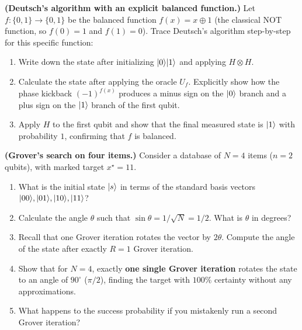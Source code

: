 \begin{exercise}\label{ch42:ex-deutsch-trace}
\textbf{(Deutsch's algorithm with an explicit balanced function.)}
Let $f: \{0, 1\} \to \{0, 1\}$ be the balanced function $f(x) = x \oplus 1$ (the classical NOT function, so $f(0) = 1$ and $f(1) = 0$).
Trace Deutsch's algorithm step-by-step for this specific function:
\begin{enumerate}
  \item Write down the state after initializing $\lvert 0 \rangle\lvert 1 \rangle$ and applying $H \otimes H$.
  \item Calculate the state after applying the oracle $U_f$. Explicitly show how the phase kickback $(-1)^{f(x)}$ produces a minus sign on the $\lvert 0 \rangle$ branch and a plus sign on the $\lvert 1 \rangle$ branch of the first qubit.
  \item Apply $H$ to the first qubit and show that the final measured state is $\lvert 1 \rangle$ with probability $1$, confirming that $f$ is balanced.
\end{enumerate}
\end{exercise}

\begin{exercise}\label{ch42:ex-grover-n4}
\textbf{(Grover's search on four items.)}
Consider a database of $N = 4$ items ($n = 2$ qubits), with marked target $x^\star = 11$.
\begin{enumerate}
  \item What is the initial state $\lvert s \rangle$ in terms of the standard basis vectors $\lvert 00 \rangle, \lvert 01 \rangle, \lvert 10 \rangle, \lvert 11 \rangle$?
  \item Calculate the angle $\theta$ such that $\sin\theta = 1/\sqrt{N} = 1/2$. What is $\theta$ in degrees?
  \item Recall that one Grover iteration rotates the vector by $2\theta$. Compute the angle of the state after exactly $R = 1$ Grover iteration.
  \item Show that for $N = 4$, exactly \textbf{one single Grover iteration} rotates the state to an angle of $90^\circ$ ($\pi/2$), finding the target with $100\%$ certainty without any approximations.
  \item What happens to the success probability if you mistakenly run a second Grover iteration?
\end{enumerate}
\end{exercise}


